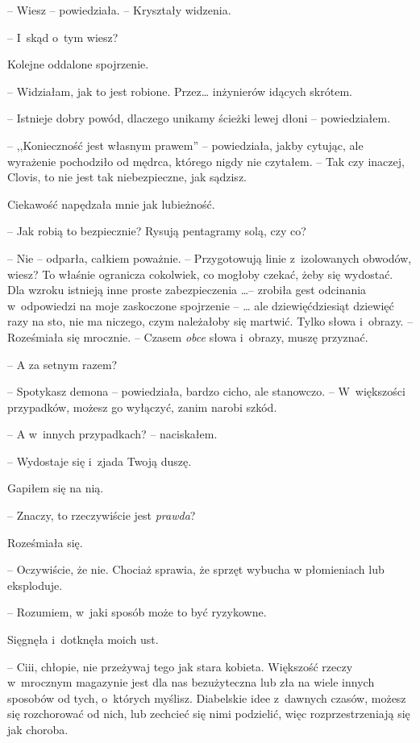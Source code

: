 \documentclass[oneside,polish,11pt,sfheadings]{mwbk}
\begin{document}
-- Wiesz -- powiedziała. -- Kryształy widzenia.

-- I~skąd o~tym wiesz?

Kolejne oddalone spojrzenie. 

-- Widziałam, jak to jest robione. Przez\ldots
inżynierów idących skrótem.

-- Istnieje dobry powód, dlaczego unikamy ścieżki lewej dłoni -- powiedziałem.

-- ,,Konieczność jest własnym prawem'' -- powiedziała, jakby cytując, ale
wyrażenie pochodziło od mędrca, którego nigdy nie czytałem. -- Tak czy
inaczej, Clovis, to nie jest tak niebezpieczne, jak sądzisz.

Ciekawość napędzała mnie jak lubieżność. 

-- Jak robią to bezpiecznie?
Rysują pentagramy solą, czy co?

-- Nie -- odparła, całkiem poważnie. -- Przygotowują linie z~izolowanych
obwodów, wiesz? To właśnie ogranicza cokolwiek, co mogłoby czekać, żeby
się wydostać. Dla wzroku istnieją inne proste zabezpieczenia \ldots -- zrobiła gest odcinania w~odpowiedzi na moje zaskoczone spojrzenie -- \ldots
ale dziewięćdziesiąt dziewięć razy na sto, nie ma niczego, czym
należałoby się martwić. Tylko słowa i~obrazy. -- Roześmiała się mrocznie.
-- Czasem \textit{obce} słowa i~obrazy, muszę przyznać.

-- A za setnym razem?

-- Spotykasz demona -- powiedziała, bardzo cicho, ale stanowczo. -- W~większości przypadków, możesz go wyłączyć, zanim narobi szkód.

-- A w~innych przypadkach? -- naciskałem.

-- Wydostaje się i~zjada Twoją duszę.

Gapiłem się na nią. 

-- Znaczy, to rzeczywiście jest \textit{prawda}?

Roześmiała się. 

-- Oczywiście, że nie. Chociaż sprawia, że sprzęt wybucha
w płomieniach lub eksploduje.

-- Rozumiem, w~jaki sposób może to być ryzykowne.

Sięgnęła i~dotknęła moich ust. 

-- Ciii, chłopie, nie przeżywaj tego jak
stara kobieta. Większość rzeczy w~mrocznym magazynie jest dla nas
bezużyteczna lub zła na wiele innych sposobów od tych, o~których
myślisz. Diabelskie idee z~dawnych czasów, możesz się rozchorować od
nich, lub zechcieć się nimi podzielić, więc rozprzestrzeniają się jak
choroba.
\end{document}
